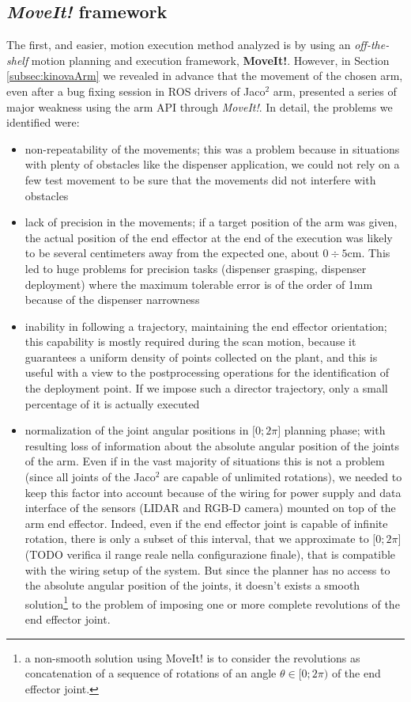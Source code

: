 \subsection{\textit{MoveIt!} framework}
The first, and easier, motion execution method analyzed is by using an \textit{off-the-shelf} motion planning and execution framework, \textbf{MoveIt!}. However, in Section \ref{subsec:kinovaArm} we revealed in advance that the movement of the chosen arm, even after a bug fixing session in \ac{ROS} drivers of Jaco$^2$ arm, presented a series of major weakness using the arm \ac{API} through \textit{MoveIt!}. In detail, the problems we identified were:
\begin{itemize}
	\item non-repeatability of the movements; this was a problem because in situations with plenty of obstacles like the dispenser application, we could not rely on a few test movement to be sure that the movements did not interfere with obstacles
	\item lack of precision in the movements; if a target position of the arm was given, the actual position of the end effector at the end of the execution was likely to be several centimeters away from the expected one, about $0\div5$cm. This led to huge problems for precision tasks (dispenser grasping, dispenser deployment) where the maximum tolerable error is of the order of 1mm because of the dispenser narrowness
	\item inability in following a trajectory, maintaining the end effector orientation; this capability is mostly required during the scan motion, because it guarantees a uniform density of points collected on the plant, and this is useful with a view to the postprocessing operations for the identification of the deployment point. If we impose such a director trajectory, only a small percentage of it is actually executed
	\item normalization of the joint angular positions in $\lbrack 0;2\pi\rbrack$ planning phase; with resulting loss of information about the absolute angular position of the joints of the arm. Even if in the vast majority of situations this is not a problem (since all joints of the Jaco$^2$ are capable of unlimited rotations), we needed to keep this factor into account because of the wiring for power supply and data interface of the sensors (\ac{LIDAR} and RGB-D camera) mounted on top of the arm end effector. Indeed, even if the end effector joint is capable of infinite rotation, there is only a subset of this interval, that we approximate to $\lbrack0;2\pi\rbrack$ (TODO verifica il range reale nella configurazione finale), that is compatible with the wiring setup of the system. But since the planner has no access to the absolute angular position of the joints, it doesn't exists a smooth solution\footnote{a non-smooth solution using MoveIt! is to consider the revolutions as concatenation of a sequence of rotations of an angle $\theta\in\lbrack0;2\pi)$ of the end effector joint.}
to the problem of imposing one or more complete revolutions of the end effector joint.
\end{itemize}

